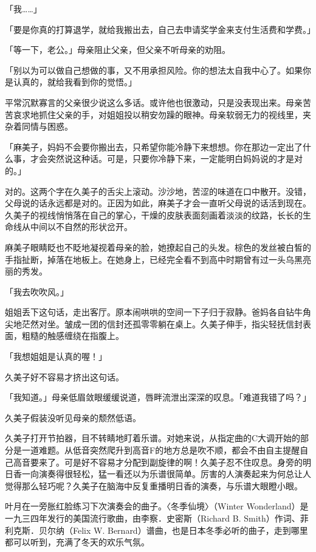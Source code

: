 \documentclass[UTF8]{ctexart}
\begin{document}
    「我……」 

    「要是你真的打算退学，就给我搬出去，自己去申请奖学金来支付生活费和学费。」 

    「等一下，老公。」母亲阻止父亲，但父亲不听母亲的劝阻。 

    「别以为可以做自己想做的事，又不用承担风险。你的想法太自我中心了。如果你是认真的，就给我看到你的觉悟。」 

    平常沉默寡言的父亲很少说这么多话。或许他也很激动，只是没表现出来。母亲苦苦哀求地抓住父亲的手，对姐姐投以稍安勿躁的眼神。母亲软弱无力的视线里，夹杂着同情与困惑。 

    「麻美子，妈妈不会要你搬出去，只希望你能冷静下来想想。你在那边一定出了什么事，才会突然说这种话。可是，只要你冷静下来，一定能明白妈妈说的才是对的。」 

    对的。这两个字在久美子的舌尖上滚动。沙沙地，苦涩的味道在口中散开。没错，父母说的话永远都是对的。正因为如此，麻美子才会一直听父母说的话活到现在。久美子的视线悄悄落在自己的掌心，干燥的皮肤表面刻画着淡淡的纹路，长长的生命线从中间以不自然的形状岔开。 

    麻美子眼睛眨也不眨地凝视着母亲的脸，她撩起自己的头发。棕色的发丝被白皙的手指扯断，掉落在地板上。在她身上，已经完全看不到高中时期曾有过一头乌黑亮丽的秀发。 

    「我去吹吹风。」 

    姐姐丢下这句话，走出客厅。原本闹哄哄的空间一下子归于寂静。爸妈各自钻牛角尖地茫然对坐。皱成一团的信封还孤零零躺在桌上。久美子伸手，指尖轻抚信封表面，粗糙的触感缠绕在指腹上。 

    「我想姐姐是认真的喔！」 

    久美子好不容易才挤出这句话。 

    「我知道。」母亲低眉敛眼缓缓说道，唇畔流泄出深深的叹息。「难道我错了吗？」 

    久美子假装没听见母亲的颓然低语。 

    久美子打开节拍器，目不转睛地盯着乐谱。对她来说，从指定曲的C大调开始的部分是一道难题。从低音突然爬升到高音F的地方总是吹不顺，都会不由自主提醒自己高音要来了。可是好不容易才分配到副旋律的啊！久美子忍不住叹息。身旁的明日香一向演奏得很轻松，猛一看还以为乐谱很简单。厉害的人演奏起来为何总让人觉得那么轻巧呢？久美子在脑海中反复重播明日香的演奏，与乐谱大眼瞪小眼。 

    叶月在一旁胀红脸练习下次演奏会的曲子。〈冬季仙境〉（Winter Wonderland）是一九三四年发行的美国流行歌曲，由李察．史密斯（Richard B. Smith）作词、菲利克斯．贝尔纳（Felix W. Bernard）谱曲，也是日本冬季必听的曲子，走到哪里都可以听到，充满了冬天的欢乐气氛。 
\end{document}
